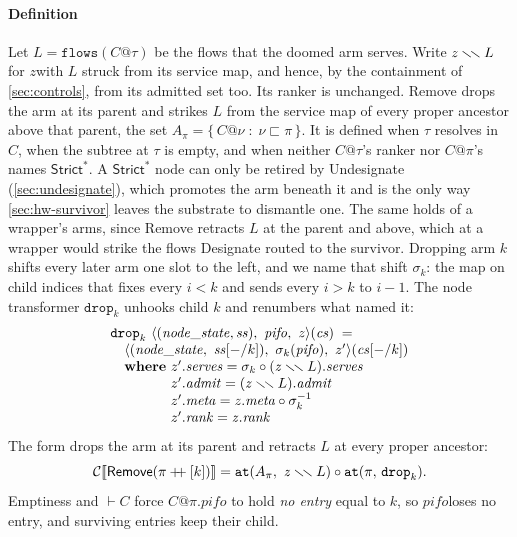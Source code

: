 \documentclass[sigplan,anonymous,review,nonacm]{acmart}
\newcommand{\csem}[1]{\mathcal{C}\llbracket #1 \rrbracket}
\newcommand{\notation}[1]{\ensuremath{#1}\ifmmode\else\xspace\fi}
\newcommand{\pifo}{\notation{\mathit{pifo}}}
\newcommand{\zz}{\notation{\mathit{z}}}
\newcommand{\Strictstar}{\textsf{Strict}^{*}}
\newcommand{\dsetminus}{\mathbin{\smallsetminus\mkern-3mu\smallsetminus}}
\newcommand{\Remove}{\textsf{Remove}}
\newcommand{\Designate}{\textsf{Designate}}
\newcommand{\Undesignate}{\textsf{Undesignate}}
\begin{document}
\paragraph{Definition}

Let \(L = \mathtt{flows}(C@\tau)\) be the flows that the doomed arm serves.
Write \(\mathit{z} \dsetminus L\) for \zz with \(L\) struck from its service map, and hence, by the containment of \cref{sec:controls}, from its admitted set too.
Its ranker is unchanged.
\Remove{} drops the arm at its parent and strikes \(L\) from the service map of every proper ancestor above that parent, the set \(A_\pi = \{\, C@\nu \;:\; \nu \sqsubset \pi \,\}\).
It is defined when \(\tau\) resolves in \(C\), when the subtree at \(\tau\) is empty, and when neither \(C@\tau\)'s ranker nor \(C@\pi\)'s names \(\Strictstar\).
A \(\Strictstar\) node can only be retired by \Undesignate{} (\cref{sec:undesignate}), which promotes the arm beneath it and is the only way \cref{sec:hw-survivor} leaves the substrate to dismantle one.
The same holds of a wrapper's arms, since \Remove{} retracts \(L\) at the parent and above, which at a wrapper would strike the flows \Designate{} routed to the survivor.
Dropping arm \(k\) shifts every later arm one slot to the left, and we name that shift \(\sigma_k\): the map on child indices that fixes every \(i < k\) and sends every \(i > k\) to \(i-1\).
The node transformer \(\mathtt{drop}_k\) unhooks child \(k\) and renumbers what named it:
{\small
\[
\begin{array}{@{}l@{}}
\mathtt{drop}_k\ \langle(\mathit{node\_state}, \mathit{ss}),\ \mathit{pifo},\ \mathit{z}\rangle(\mathit{cs}) \;=\\
\quad \langle(\mathit{node\_state},\ \mathit{ss}[-/k]),\ \sigma_k(\mathit{pifo}),\ z'\rangle(\mathit{cs}[-/k])\\
\quad \textbf{where}\ z'.\mathit{serves} = \sigma_k \circ (\mathit{z} \dsetminus L).\mathit{serves}\\
\quad \phantom{\textbf{where}}\ z'.\mathit{admit} = (\mathit{z} \dsetminus L).\mathit{admit}\\
\quad \phantom{\textbf{where}}\ z'.\mathit{meta} = \mathit{z}.\mathit{meta} \circ \sigma_k^{-1}\\
\quad \phantom{\textbf{where}}\ z'.\mathit{rank} = \mathit{z}.\mathit{rank}
\end{array}
\]
}
The form drops the arm at its parent and retracts \(L\) at every proper ancestor:
\[
\csem{\Remove(\pi \mathbin{+\!\!+} [k])} = \mathtt{at}(A_\pi,\ \mathit{z} \dsetminus L) \circ \mathtt{at}(\pi,\, \mathtt{drop}_k).
\]
Emptiness and \(\vdash C\) force \(C@\pi.\mathit{pifo}\) to hold \emph{no entry} equal to \(k\), so \pifo loses no entry, and surviving entries keep their child.
\end{document}
